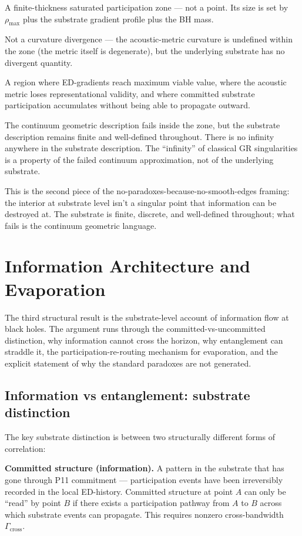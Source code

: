 \documentclass[11pt,a4paper]{article}
\begin{document}
A finite-thickness saturated participation zone --- not a point. Its size is set by $\rho_{\mathrm{max}}$ plus the substrate gradient profile plus the BH mass.

Not a curvature divergence --- the acoustic-metric curvature is undefined within the zone (the metric itself is degenerate), but the underlying substrate has no divergent quantity.

A region where ED-gradients reach maximum viable value, where the acoustic metric loses representational validity, and where committed substrate participation accumulates without being able to propagate outward.

The continuum geometric description fails inside the zone, but the substrate description remains finite and well-defined throughout. There is no infinity anywhere in the substrate description. The ``infinity'' of classical GR singularities is a property of the failed continuum approximation, not of the underlying substrate.

This is the second piece of the no-paradoxes-because-no-smooth-edges framing: the interior at substrate level isn't a singular point that information can be destroyed at. The substrate is finite, discrete, and well-defined throughout; what fails is the continuum geometric language.

\section{Information Architecture and Evaporation}

The third structural result is the substrate-level account of information flow at black holes. The argument runs through the committed-vs-uncommitted distinction, why information cannot cross the horizon, why entanglement can straddle it, the participation-re-routing mechanism for evaporation, and the explicit statement of why the standard paradoxes are not generated.

\subsection{Information vs entanglement: substrate distinction}

The key substrate distinction is between two structurally different forms of correlation:

\textbf{Committed structure (information).} A pattern in the substrate that has gone through P11 commitment --- participation events have been irreversibly recorded in the local ED-history. Committed structure at point $A$ can only be ``read'' by point $B$ if there exists a participation pathway from $A$ to $B$ across which substrate events can propagate. This requires nonzero cross-bandwidth $\Gamma_{\mathrm{cross}}$.
\end{document}
